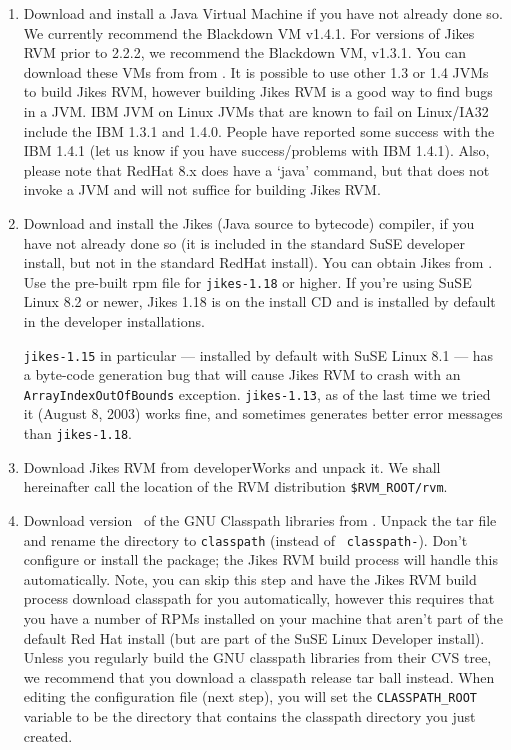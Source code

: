 \begin{enumerate}

\item Download and install a Java Virtual Machine if you have not
already done so.  We currently recommend the Blackdown VM v1.4.1. 
For versions of Jikes RVM prior to 2.2.2, we recommend
the Blackdown VM, v1.3.1.  You can download these VMs from 
from \xlink{{\tt \BlackdownURL}} {\BlackdownURL}. 
It is possible to use other 1.3 or 1.4 JVMs to build Jikes RVM,
however building Jikes RVM is a good way to find bugs in a JVM.
{\index IBM JVM on Linux}
JVMs that are known to fail on Linux/IA32 include the IBM 1.3.1 and
1.4.0.  People have reported some success with the IBM 1.4.1 (let us
know if you have success/problems with IBM 1.4.1). Also, please note
that RedHat 8.x does have a `java' command, but that does not invoke a
JVM and will not suffice for building Jikes RVM.

\item Download and install the Jikes (Java source to bytecode)
compiler, if you have not already 
done so (it is included in the standard SuSE developer install, but not in
the standard RedHat install).  You can 
obtain Jikes from .
Use the pre-built rpm file for {\tt jikes-1.18} or higher.   
If you're using SuSE Linux 8.2 or newer, Jikes 1.18 is on the install
CD and is installed by default in the developer installations. 


{\tt jikes-1.15} in
particular --- installed by default with SuSE Linux 8.1 --- has a
byte-code generation bug that will cause Jikes RVM to crash with an
{\tt ArrayIndexOutOfBounds} exception.  {\tt jikes-1.13}, as of the last
time we tried it (August 8, 2003) works fine, and sometimes generates
better error messages than {\tt jikes-1.18}.

\item Download Jikes RVM from developerWorks and unpack it.  We shall
hereinafter call the location of the RVM distribution {\tt \$RVM\_ROOT/rvm}.

\item Download version \classpathversion\ of the GNU Classpath
libraries from 
\xlink{{\tt \classpathftp}}{\classpathftp}. 
Unpack the tar file and rename the
directory to {\tt classpath} (instead of {\tt
classpath-\classpathversion}). Don't 
configure or install the package; the Jikes RVM build process will
handle this automatically.  Note, you can skip this step and have the
Jikes RVM build process download classpath for you automatically,
however this requires that you have a number of RPMs installed
on your machine that aren't part of the default Red Hat install (but
are part of the SuSE Linux Developer install).
Unless you regularly build the GNU classpath libraries from their CVS
tree, we recommend that you download a classpath release tar ball
instead.  When editing the configuration file (next step), you will set
the {\tt CLASSPATH\_ROOT} variable to be the directory that contains the
classpath directory you just created.  


\end{enumerate}
